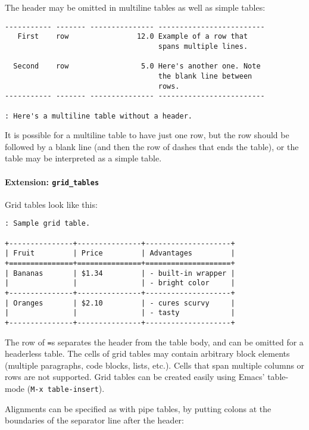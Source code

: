 \documentclass[
]{article}
\begin{document}
The header may be omitted in multiline tables as well as simple tables:

\begin{verbatim}
----------- ------- --------------- -------------------------
   First    row                12.0 Example of a row that
                                    spans multiple lines.

  Second    row                 5.0 Here's another one. Note
                                    the blank line between
                                    rows.
----------- ------- --------------- -------------------------

: Here's a multiline table without a header.
\end{verbatim}

It is possible for a multiline table to have just one row, but the row
should be followed by a blank line (and then the row of dashes that ends
the table), or the table may be interpreted as a simple table.

\hypertarget{extension-grid_tables}{%
\paragraph{\texorpdfstring{Extension:
\texttt{grid\_tables}}{Extension: grid\_tables}}\label{extension-grid_tables}}

Grid tables look like this:

\begin{verbatim}
: Sample grid table.

+---------------+---------------+--------------------+
| Fruit         | Price         | Advantages         |
+===============+===============+====================+
| Bananas       | $1.34         | - built-in wrapper |
|               |               | - bright color     |
+---------------+---------------+--------------------+
| Oranges       | $2.10         | - cures scurvy     |
|               |               | - tasty            |
+---------------+---------------+--------------------+
\end{verbatim}

The row of \texttt{=}s separates the header from the table body, and can
be omitted for a headerless table. The cells of grid tables may contain
arbitrary block elements (multiple paragraphs, code blocks, lists,
etc.). Cells that span multiple columns or rows are not supported. Grid
tables can be created easily using Emacs' table-mode
(\texttt{M-x\ table-insert}).

Alignments can be specified as with pipe tables, by putting colons at
the boundaries of the separator line after the header:
\end{document}
